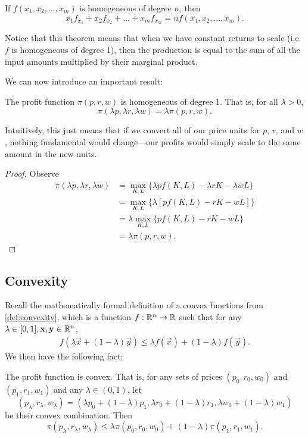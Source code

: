 \begin{theorem}[Euler]
If $f(x_1, x_2, \ldots, x_m)$ is homogeneous of degree $n$, then 
$$x_{1} f_{x_{1}}+x_{2} f_{x_{2}}+\ldots+x_{m} f_{x_{m}}=n f\left(x_{1}, x_{2}, \ldots, x_{m}\right).$$
\end{theorem}
Notice that this theorem means that when we have constant returns to scale (i.e. $f$ is homogeneous of degree 1), then the production is equal to the sum of all the input amounts multiplied by their marginal product.

We can now introduce an important result:
\begin{proposition}
The profit function $\pi(p, r, w)$ is homogeneous of degree 1. That is, for all $\lambda > 0$, 
$$\pi(\lambda p, \lambda r, \lambda w) = \lambda \pi(p, r, w).$$
\end{proposition}
Intuitively, this just means that if we convert all of our price units for $p$, $r$, and $w$, nothing fundamental would change---our profits would simply scale to the same amount in the new units.
\begin{proof}
Observe
$$
\begin{aligned}
\pi(\lambda p, \lambda r, \lambda w)&= \max _{K, L}\{\lambda p f(K, L)-\lambda r K-\lambda w L\} \\
&= \max _{K, L}\{\lambda[p f(K, L)-r K-w L]\} \\
&=\lambda \max _{K, L}\{p f(K, L)-r K-w L\}\\
&=\lambda \pi(p, r, w).
\end{aligned}
$$
\end{proof}

\subsection*{Convexity}
Recall the mathematically formal definition of a convex functions from \ref{def:convexity}, which is a function $f: \mathbb{R}^n \to \mathbb{R}$ such that for any $\lambda \in [0, 1], \mathbf{x}, \mathbf{y} \in \mathbb{R}^n$,
\begin{align*}
    f(\lambda \vec{x} + (1 - \lambda) \vec{y}) \leq \lambda f(\vec{x}) + (1 - \lambda) f(\vec{y}).
\end{align*}
We then have the following fact:
\begin{proposition*}
The profit function is convex. That is, for any sets of prices $(p_0, r_0, w_0)$ and $(p_1, r_1, w_1)$ and any $\lambda \in (0, 1)$, let
$$\left(p_{\lambda}, r_{\lambda}, w_{\lambda}\right)=\left(\lambda p_{0}+(1-\lambda) p_{1}, \lambda r_{0}+(1-\lambda) r_{1}, \lambda w_{0}+(1-\lambda) w_{1}\right)$$
be their convex combination. Then 
$$\pi\left(p_{\lambda}, r_{\lambda}, w_{\lambda}\right) \leq \lambda \pi\left(p_{0}, r_{0}, w_{0}\right)+(1-\lambda) \pi\left(p_{1}, r_{1}, w_{1}\right).$$
\end{proposition*}

